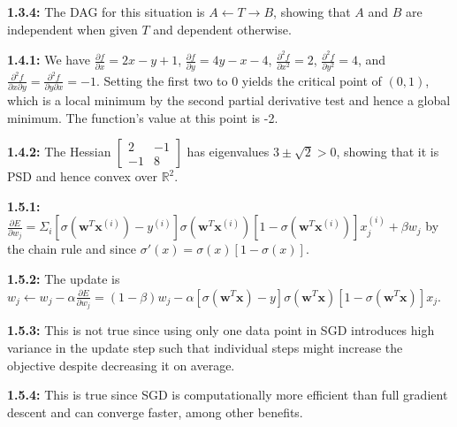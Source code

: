 \documentclass[12pt]{article}
\newcommand{\m}[1]{\mathbf{#1}}
\newcommand{\R}{\mathbb{R}}
\begin{document}
\textbf{1.3.4:} The DAG for this situation is $A\leftarrow T\to B$, showing that $A$ and $B$ are independent when given $T$ and dependent otherwise.

\textbf{1.4.1:} We have $\frac{\partial f}{\partial x}=2x-y+1$, $\frac{\partial f}{\partial y}=4y-x-4$, $\frac{\partial^2 f}{\partial x^2}=2$, $\frac{\partial^2 f}{\partial y^2}=4$, and $\frac{\partial^2 f}{\partial x\partial y}=\frac{\partial^2 f}{\partial y\partial x}=-1$. Setting the first two to 0 yields the critical point of $(0,1)$, which is a local minimum by the second partial derivative test and hence a global minimum. The function's value at this point is -2.

\textbf{1.4.2:} The Hessian $\begin{bmatrix} 2 & -1 \\ -1 & 8 \end{bmatrix}$ has eigenvalues $3\pm\sqrt{2}>0$, showing that it is PSD and hence convex over $\R^2$.

\textbf{1.5.1:} $\frac{\partial E}{\partial w_j}=\Sigma_i[\sigma(\m w^T\m x^{(i)})-y^{(i)}]\sigma(\m w^T\m x^{(i)})[1-\sigma(\m w^T\m x^{(i)})]x_j^{(i)}+\beta w_j$ by the chain rule and since $\sigma'(x)=\sigma(x)[1-\sigma(x)]$.

\textbf{1.5.2:} The update is $w_j\leftarrow w_j-\alpha\frac{\partial E}{\partial w_j}=(1-\beta)w_j-\alpha[\sigma(\m w^T\m x)-y]\sigma(\m w^T\m x)[1-\sigma(\m w^T\m x)]x_j$.

\textbf{1.5.3:} This is not true since using only one data point in SGD introduces high variance in the update step such that individual steps might increase the objective despite decreasing it on average.

\textbf{1.5.4:} This is true since SGD is computationally more efficient than full gradient descent and can converge faster, among other benefits.
\end{document}
